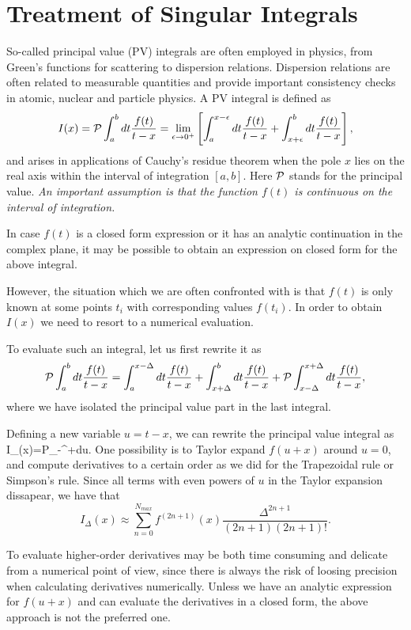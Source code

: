 \section{Treatment of Singular Integrals}

So-called principal value (PV) integrals are often employed in physics,
from Green's functions for scattering to dispersion relations.
Dispersion relations are often related to measurable quantities
and provide important consistency checks in atomic, nuclear and
particle physics. 
A PV integral is defined as
\[
   I(x)={\cal P}\int_a^bdt\frac{f(t)}{t-x}=\lim_{\epsilon\rightarrow 0^+}
\left[\int_a^{x-\epsilon}dt\frac{f(t)}{t-x}+\int_{x+\epsilon}^bdt\frac{f(t)}{t-x}\right],
\]
and 
arises in applications
of Cauchy's residue theorem when the pole $x$  lies 
on the real axis within the interval of integration $[a,b]$. Here ${\cal P}$ stands for the principal value.
{\em An important assumption is that the function $f(t)$ is continuous 
on the interval of integration. }

In case $f(t)$ is a closed form expression or it has an analytic continuation
in the complex plane, it may be  possible to obtain an expression on closed
form for the above integral. 

However, the situation which we are often confronted with is that
$f(t)$ is only known at some points $t_i$ with corresponding
values $f(t_i)$. In order to obtain $I(x)$ we need to resort to a
numerical evaluation.

To evaluate such an integral, let us first rewrite it as
\[
 {\cal P}\int_a^bdt\frac{f(t)}{t-x}=
\int_a^{x-\Delta}dt\frac{f(t)}{t-x}+\int_{x+\Delta}^bdt\frac{f(t)}{t-x}+
{\cal P}\int_{x-\Delta}^{x+\Delta}dt\frac{f(t)}{t-x},
\]
where we have isolated the principal value part in the last integral. 

Defining a new variable $u=t-x$, we can rewrite the principal value
integral as
\be
I_{\Delta}(x)={\cal P}\int_{-\Delta}^{+\Delta}du.
\label{eq:deltaint}
\ee
One possibility is to Taylor expand $f(u+x)$ around $u=0$, and compute
derivatives to a certain order as we did for the Trapezoidal rule or
Simpson's rule. 
Since all terms with even powers of $u$ in the Taylor expansion dissapear,
we have that 
\[
I_{\Delta}(x)\approx \sum_{n=0}^{N_{max}}f^{(2n+1)}(x)
                     \frac{\Delta^{2n+1}}{(2n+1)(2n+1)!}.
\]

To evaluate higher-order derivatives may be both time 
consuming and delicate from a numerical point of view, since 
there is always the risk of loosing precision when calculating
derivatives numerically. Unless we have an analytic expression
for $f(u+x)$ and can evaluate the derivatives in a closed form,
the above approach is not the preferred one. 

